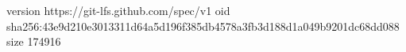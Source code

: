 version https://git-lfs.github.com/spec/v1
oid sha256:43e9d210e3013311d64a5d196f385db4578a3fb3d188d1a049b9201dc68dd088
size 174916
